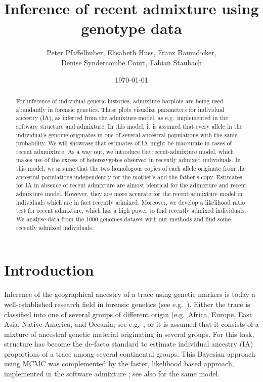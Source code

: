 \documentclass[12pt]{article}
\theoremstyle{definition}
\begin{document}
\title{\LARGE Inference of recent admixture using genotype data}

\author{\sc Peter Pfaffelhuber, Elisabeth Huss, Franz Baumdicker, \\
  \sc Denise Syndercombe Court, Fabian Staubach}

\date{\today}

\maketitle

\begin{abstract}
  \noindent
  For inference of individual genetic histories, admixture barplots
  are being used abundantly in forensic genetics. These plots
  visualize parameters for individual ancestry (IA), as inferred from
  the admixture-model, as e.g.\ implemented in the software {\sc
    structure} and {\sc admixture}. In this model, it is assumed that
  every allele in the individual's genome originates in one of several
  ancestral populations with the same probability. We will showcase
  that estimates of IA might be inaccurate in cases of recent
  adxmixture. As a way out, we introduce the recent-admixture model,
  which makes use of the excess of heterozygotes observed in recently
  admixed individuals. In this model, we assume that the two
  homologous copies of each allele originate from the ancestral
  populations independently for the mother's and the father's
  copy. Estimates for IA in absence of recent admixture are almost
  identical for the admixture and recent admixture model. However,
  they are more accurate for the recent-admixture model in individuals
  which are in fact recently admixed. Moreover, we develop a
  likelihood ratio test for recent admixture, which has a high power
  to find recently admixed individuals. We analyse data from the 1000
  genomes dataset with our methods and find some recently admixed
  individuals.
\end{abstract}

\section{Introduction}

Inference of the geographical ancestry of a trace using genetic
markers is today a well-established research field in forensic
genetics (see e.g.\ \cite{Phillips2016, Eduardoff2016,
  Kidd2017}). Either the trace is classified into one of several
groups of different origin (e.g.\ Africa, Europe, East Asia, Native
America, and Oceania; see e.g.\ \cite{Snipper2007, Pfaffelhuber2019},
or it is assumed that it consists of a mixture of ancestral genetic
material originating in several groups. For this task, {\sc structure}
\cite{Pritchard2000} has become the de-facto standard to estimate
individual ancestry (IA) proportions of a trace among several
continental groups. This Bayesian approach using MCMC was complemented
by the faster, likelihood based approach, implemented in the software
{\sc admixture} \cite{Alexander2009}; see also \cite{Tang2005} for the
same model.
\end{document}
